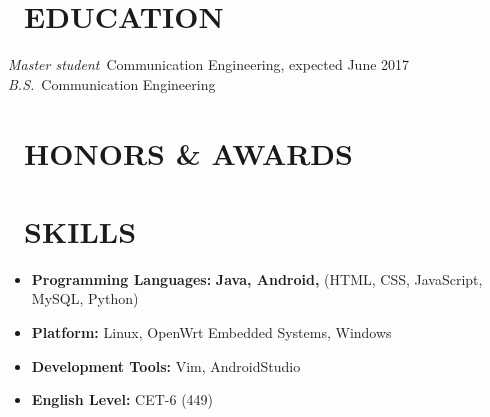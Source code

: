 \documentclass{resume}
\begin{document}



\section{\faGraduationCap\ EDUCATION}
\textit{Master student}\ Communication Engineering, expected June 2017
\textit{B.S.}\ Communication Engineering

\section{\faTrophy\ HONORS \& AWARDS}
\begin{onehalfspacing}
\end{onehalfspacing}


\section{\faCogs\ SKILLS}
\begin{itemize}[parsep=0.5ex]
  \item \textbf{Programming Languages:} \textbf{Java, Android,} (HTML, CSS, JavaScript, MySQL, Python)
  \item \textbf{Platform:} Linux, OpenWrt Embedded Systems, Windows
  \item \textbf{Development Tools:} Vim, AndroidStudio
  \item \textbf{English Level:} CET-6 (449)
\end{itemize}
\end{document}
